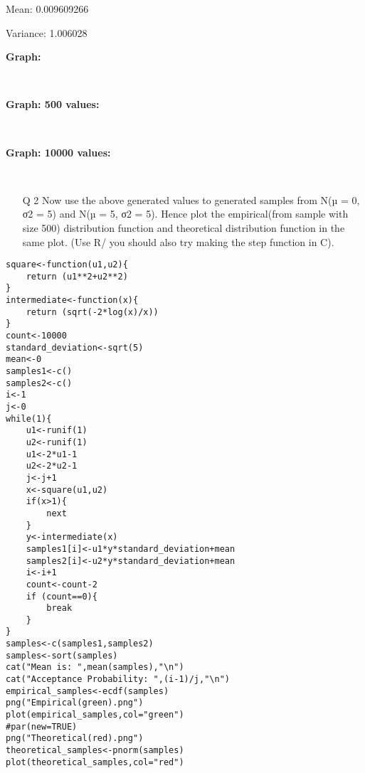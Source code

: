 \documentclass[11pt]{article}
\begin{document}

Mean:  0.009609266\

Variance:  1.006028 \

\textbf{Graph: }\
\begin{figure}[H]
  \centering
 \\
\end{figure}
\textbf{Graph: 500 values: }\
\begin{figure}[H]
  \centering
 \\
\end{figure}
\textbf{Graph: 10000 values: }\
\begin{figure}[H]
  \centering
 \\
\end{figure}

\begin{enumerate}
\item[Q 2] Now use the above generated values to generated samples from N(µ = 0, σ2 = 5) and
N(µ = 5, σ2 = 5). Hence plot the empirical(from sample with size 500) distribution
function and theoretical distribution function in the same plot. (Use R/ you should
also try making the step function in C).
\end{enumerate}

\begin{lstlisting}
square<-function(u1,u2){
	return (u1**2+u2**2)
}
intermediate<-function(x){
	return (sqrt(-2*log(x)/x))
}
count<-10000
standard_deviation<-sqrt(5)
mean<-0
samples1<-c()
samples2<-c()
i<-1
j<-0
while(1){
	u1<-runif(1)
	u2<-runif(1)
	u1<-2*u1-1
	u2<-2*u2-1
	j<-j+1
	x<-square(u1,u2)
	if(x>1){
		next
	}
	y<-intermediate(x)
	samples1[i]<-u1*y*standard_deviation+mean
	samples2[i]<-u2*y*standard_deviation+mean
	i<-i+1
	count<-count-2
	if (count==0){
		break
	}
}
samples<-c(samples1,samples2)
samples<-sort(samples)
cat("Mean is: ",mean(samples),"\n")
cat("Acceptance Probability: ",(i-1)/j,"\n")	
empirical_samples<-ecdf(samples)
png("Empirical(green).png")
plot(empirical_samples,col="green")
#par(new=TRUE)
png("Theoretical(red).png")
theoretical_samples<-pnorm(samples)
plot(theoretical_samples,col="red")
\end{lstlisting}
\end{document}

